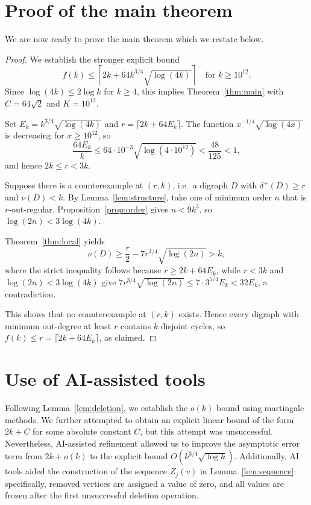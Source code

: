 \documentclass[a4paper,12pt]{article}
\numberwithin{equation}{section}
\begin{document}


\section{Proof of the main theorem}\label{sec:mainproof}

We are now ready to prove the main theorem which we restate below.

\MainThm
\begin{proof}
We establish the stronger explicit bound
$$
f(k)\le\left\lceil2k+64k^{3/4}\sqrt{\log(4k)}\right\rceil
\quad\text{for }k\ge10^{12}.
$$
Since $\log(4k)\le2\log k$ for $k\ge4$, this implies
Theorem~\ref{thm:main} with $C=64\sqrt2$ and $K=10^{12}$.

Set $E_k=k^{3/4}\sqrt{\log(4k)}$ and $r=\lceil2k+64E_k\rceil$.
The function $x^{-1/4}\sqrt{\log(4x)}$ is decreasing for $x\ge10^{12}$, so
$$
\frac{64E_k}{k}\le64\cdot10^{-3}\sqrt{\log(4\cdot10^{12})}<\frac{48}{125}<1,
$$
and hence $2k\le r<3k$.

Suppose there is a counterexample at $(r,k)$,
i.e.\ a digraph $D$ with $\delta^+(D)\ge r$ and $\nu(D)<k$. By
Lemma~\ref{lem:structure}, take one of minimum order $n$ that is
$r$-out-regular. Proposition~\ref{prop:order} gives $n<9k^3$, so
$\log(2n)<3\log(4k)$.

Theorem~\ref{thm:local} yields
$$
\nu(D)\ge\frac r2-7r^{3/4}\sqrt{\log(2n)}>k,
$$
where the strict inequality follows because $r\ge2k+64E_k$, while
$r<3k$ and $\log(2n)<3\log(4k)$ give
$7r^{3/4}\sqrt{\log(2n)}\le7\cdot3^{5/4}E_k<32E_k$, a contradiction.

This shows that no counterexample at $(r,k)$ exists. Hence every
digraph with minimum out-degree at least $r$ contains $k$ disjoint
cycles, so $f(k)\le r=\lceil2k+64E_k\rceil$, as claimed.
\end{proof}



\section*{Use of AI-assisted tools} 

Following Lemma~\ref{lem:deletion}, we establish the $o(k)$ bound using martingale methods. We further attempted to obtain an explicit linear bound of the form $2k+C$ for some absolute constant $C$, but this attempt was unsuccessful. Nevertheless, AI-assisted refinement allowed us to improve the asymptotic error term from $2k+o(k)$ to the explicit bound $O(k^{3/4}\sqrt{\log k})$. Additionally, AI tools aided the construction of the sequence $Z_j(v)$ in Lemma~\ref{lem:sequence}: specifically, removed vertices are assigned a value of zero, and all values are frozen after the first unsuccessful deletion operation.
\end{document}

